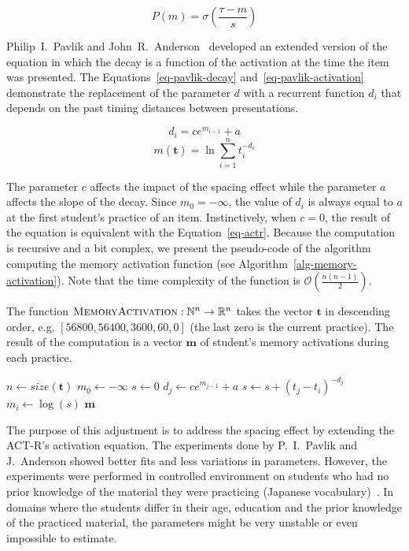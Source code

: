 \begin{equation} \label{eq-actr-p}
  P(m) = \sigma\left(\frac{\tau - m}{s}\right)
\end{equation}

Philip~I.~Pavlik and John~R.~Anderson~\cite{Pavlik2005} developed an extended version of the equation in which the decay is a function of the activation at the time the item was presented. The Equations~\ref{eq-pavlik-decay} and~\ref{eq-pavlik-activation} demonstrate the replacement of the parameter $d$ with a recurrent function $d_i$ that depends on the past timing distances between presentations.

\begin{equation} \label{eq-pavlik-decay}
  d_i = ce^{m_{i-1}} + a
\end{equation}
\begin{equation} \label{eq-pavlik-activation}
  m(\mathbf{t}) = \ln{\sum_{i=1}^{n} t_{i}^{-d_i}}
\end{equation}

The parameter $c$ affects the impact of the spacing effect while the parameter $a$ affects the slope of the decay. Since $m_0 = -\infty$, the value of $d_i$ is always equal to $a$ at the first student's practice of an item. Instinctively, when $c = 0$, the result of the equation is equivalent with the Equation~\ref{eq-actr}. Because the computation is recursive and a bit complex, we present the pseudo-code of the algorithm computing the memory activation function (see Algorithm~\ref{alg-memory-activation}). Note that the time complexity of the function is $\mathcal{O}\left(\frac{n(n-1)}{2}\right)$.

\begin{algorithm}
  \caption{The function $\textsc{MemoryActivation}: \mathbb{N}^n \rightarrow \mathbb{R}^n$ takes the vector $\mathbf{t}$ in descending order, e.g. $[56800, 56400, 3600, 60, 0]$ (the last zero is the current practice). The result of the computation is a vector $\mathbf{m}$ of student's memory activations during each practice.}
  \label{alg-memory-activation}
  \begin{algorithmic}[1]
      \State $n \gets size(\mathbf{t})$
      \State $m_0 \gets -\infty$
        \State $s \gets 0$
          \State $d_j \gets ce^{m_{j-1}} + a$
          \State $s \gets s + (t_j - t_i)^{-d_j}$
        \EndFor
        \State $m_i \gets \log(s)$
      \EndFor
      \State \Return $\mathbf{m}$
    \EndFunction
  \end{algorithmic}
\end{algorithm}

The purpose of this adjustment is to address the spacing effect by extending the ACT-R's activation equation. The experiments done by P.~I.~Pavlik and J.~Anderson showed better fits and less variations in parameters. However, the experiments were performed in controlled environment on students who had no prior knowledge of the material they were practicing (Japanese vocabulary)~\cite{Pavlik2005}. In domains where the students differ in their age, education and the prior knowledge of the practiced material, the parameters might be very unstable or even impossible to estimate.

